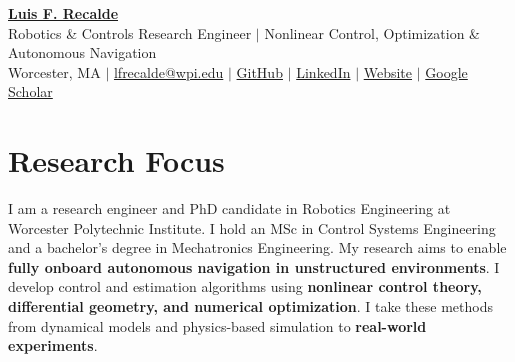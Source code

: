 \documentclass[letterpaper,11pt]{article}
\newcommand{\websiteURL}{https://lfrecalde1.github.io/}
\begin{document}
\begin{center}
\href{\websiteURL}{\textcolor{AuthorTeal}{\textbf{\Huge Luis F. Recalde}}} \\ \vspace{3pt}
\small Robotics \& Controls Research Engineer $|$ Nonlinear Control, Optimization \& Autonomous Navigation \\ \vspace{3pt}
Worcester, MA $|$ \href{mailto:lfrecalde@wpi.edu}{lfrecalde@wpi.edu} $|$
\href{https://github.com/lfrecalde1}{GitHub} $|$
\href{https://www.linkedin.com/in/luis-f-recalde-8a6432123}{LinkedIn} $|$
\href{\websiteURL}{Website} $|$
\href{https://scholar.google.com/citations?user=_v1511cAAAAJ}{Google Scholar}
\end{center}
\vspace{-12pt}
\section{Research Focus}
{\small I am a research engineer and PhD candidate in Robotics Engineering at Worcester Polytechnic Institute.
I hold an MSc in Control Systems Engineering and a bachelor's degree in Mechatronics Engineering.
My research aims to enable \textbf{fully onboard autonomous navigation in unstructured environments}.
I develop control and estimation algorithms using \textbf{nonlinear control theory, differential geometry, and numerical optimization}.
I take these methods from dynamical models and physics-based simulation to \textbf{real-world experiments}.\par}
\end{document}
